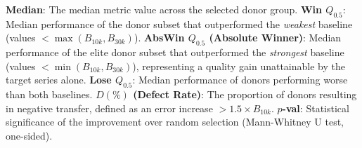 \begin{table}[t]
\begin{justify}
\textbf{Median}: The median metric value across the selected donor group. 
\textbf{Win $Q_{0.5}$}: Median performance of the donor subset that outperformed the \textit{weakest} baseline (values $< \max(B_{10k}, B_{30k})$). 
\textbf{AbsWin $Q_{0.5}$ (Absolute Winner)}: Median performance of the elite donor subset that outperformed the \textit{strongest} baseline (values $< \min(B_{10k}, B_{30k})$), representing a quality gain unattainable by the target series alone. 
\textbf{Lose $Q_{0.5}$}: Median performance of donors performing worse than both baselines. 
\textbf{$D (\%)$ (Defect Rate)}: The proportion of donors resulting in negative transfer, defined as an error increase $> 1.5 \times B_{10k}$. 
\textbf{$p$-val}: Statistical significance of the improvement over random selection (Mann-Whitney U test, one-sided).
\end{justify}
\end{table}